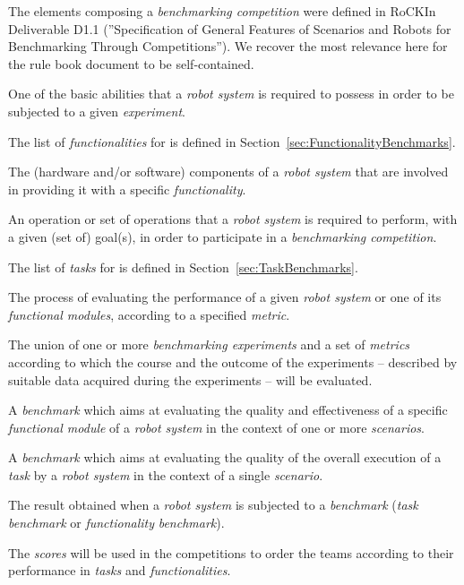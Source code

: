 The elements composing a \emph{benchmarking competition} were defined in RoCKIn Deliverable D1.1 (''Specification of General Features of Scenarios and Robots for Benchmarking Through Competitions''). We recover the most relevance here for the rule book document to be self-contained.
%
\begin{definition}[Functionality] 
One of the basic abilities that a \emph{robot system} is required to possess in order to be subjected to a given \emph{experiment}. 
\end{definition}
%
The list of \emph{functionalities} for \roaw is defined in Section~\ref{sec:FunctionalityBenchmarks}.
%
\begin{definition} 
The (hardware and/or software) components of a \emph{robot system} that are involved in providing it with a specific \emph{functionality}.
\end{definition}
%
\begin{definition}[Task] 
An operation or set of operations that a \emph{robot system} is required to perform, with a given (set of) goal(s), in order to participate in a \emph{benchmarking competition}. 
\end{definition}
%
The list of \emph{tasks} for \roaw is defined in Section~\ref{sec:TaskBenchmarks}.
%
\begin{definition}[Benchmarking] 
The process of evaluating the performance of a given \emph{robot system} or one of its \emph{functional modules}, according to a specified \emph{metric}. 
\end{definition}
%
\begin{definition}[Benchmark] 
The union of one or more \emph{benchmarking experiments} and a set of \emph{metrics} according to which the course and the outcome of the experiments -- described by suitable data acquired during the experiments -- will be evaluated.
\end{definition}
%
\begin{definition} 
A \emph{benchmark} which aims at evaluating the quality and effectiveness of a specific \emph{functional module} of a \emph{robot system} in the context of one or more \emph{scenarios}. 
\end{definition}
%
\begin{definition} 
A \emph{benchmark} which aims at evaluating the quality of the overall execution of a \emph{task} by a \emph{robot system} in the context of a single \emph{scenario}. 
\end{definition}
%
\begin{definition}[Score] 
The result obtained when a \emph{robot system} is subjected to a \emph{benchmark} (\emph{task} \emph{benchmark} or \emph{functionality} \emph{benchmark}). 
\end{definition}
%
The \emph{scores} will be used in the \roaw competitions to order the teams according to their performance in \emph{tasks} and \emph{functionalities}. 

